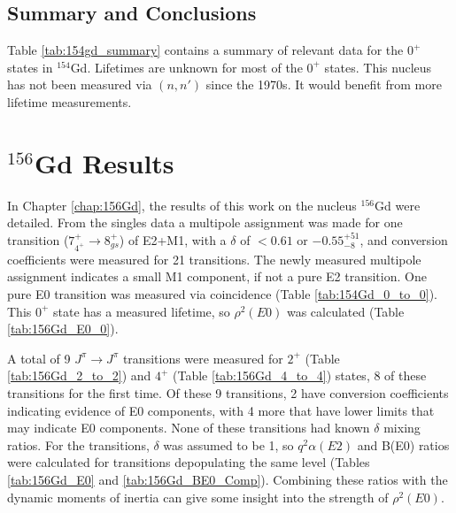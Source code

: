 



\subsection{Summary and Conclusions}

Table \ref{tab:154gd_summary} contains a summary of relevant data for the $0^+$ states in $^{154}$Gd. Lifetimes are unknown for most of the $0^+$ states. This nucleus has not been measured via $(n,n')$ since the 1970s. It would benefit from more lifetime measurements.



\section{$^{156}$Gd Results}
\label{sec:156_Dynamic}

In Chapter \ref{chap:156Gd}, the results of this work on the nucleus $^{156}$Gd were detailed. From the singles data a multipole assignment was made for one transition ($7^+_{4^+}\rightarrow 8^+_{gs}$) of E2+M1, with a $\delta$ of $<0.61$ or $-0.55^{+51}_{-8}$, and conversion coefficients were measured for 21 transitions. The newly measured multipole assignment indicates a small M1 component, if not a pure E2 transition. One pure E0 transition was measured via coincidence (Table \ref{tab:154Gd_0_to_0}). This $0^+$ state has a measured lifetime, so $\rho^2(E0)$ was calculated (Table \ref{tab:156Gd_E0_0}).

A total of 9 $J^{\pi}\rightarrow J^{\pi}$ transitions were measured for $2^+$ (Table \ref{tab:156Gd_2_to_2}) and $4^+$ (Table \ref{tab:156Gd_4_to_4}) states, 8 of these transitions for the first time. Of these 9 transitions, 2 have conversion coefficients indicating evidence of E0 components, with 4 more that have lower limits that may indicate E0 components. None of these transitions had known $\delta$ mixing ratios. For the transitions, $\delta$ was assumed to be 1, so $q^2\alpha(E2)$ and B(E0) ratios were calculated for transitions depopulating the same level (Tables \ref{tab:156Gd_E0} and \ref{tab:156Gd_BE0_Comp}). Combining these ratios with the dynamic moments of inertia can give some insight into the strength of $\rho^2(E0)$.





